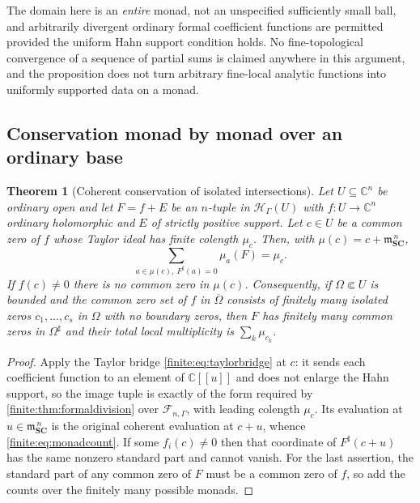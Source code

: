 \documentclass[11pt,letterpaper]{article}
\newtheorem{theorem}{Theorem}[section]
\theoremstyle{definition}
\theoremstyle{remark}
\newcommand{\SC}{\mathbf{SC}}
\newcommand{\C}{\mathbb C}
\newcommand{\HH}{\mathscr H}
\newcommand{\Af}{\mathscr F}
\newcommand{\mm}{\mathfrak m}
\newcommand{\sh}{^{\sharp}}
\numberwithin{equation}{section}
\begin{document}
The domain here is an \emph{entire} monad, not an unspecified sufficiently small ball, and arbitrarily divergent ordinary formal coefficient functions are permitted provided the uniform Hahn support condition holds. No fine-topological convergence of a sequence of partial sums is claimed anywhere in this argument, and the proposition does not turn arbitrary fine-local analytic functions into uniformly supported data on a monad.

\subsection{Conservation monad by monad over an ordinary base}
\label{finite:sec:monadcount}

\begin{theorem}[Coherent conservation of isolated intersections]
\label{finite:thm:monadcount}
Let $U\subseteq\C^n$ be ordinary open and let $F=f+E$ be an $n$-tuple in $\HH_\Gamma(U)$ with $f:U\to\C^n$ ordinary holomorphic and $E$ of strictly positive support. Let $c\in U$ be a common zero of $f$ whose Taylor ideal has finite colength $\mu_c$. Then, with $\mu(c)=c+\mm_{\SC}^{\,n}$,
\begin{equation}\label{finite:eq:monadcount}
 \sum_{a\in\mu(c),\ F\sh(a)=0}\mu_a(F)=\mu_c .
\end{equation}
If $f(c)\neq0$ there is no common zero in $\mu(c)$. Consequently, if $\Omega\Subset U$ is bounded and the common zero set of $f$ in $\overline\Omega$ consists of finitely many isolated zeros $c_1,\ldots,c_s$ in $\Omega$ with no boundary zeros, then $F$ has finitely many common zeros in $\Omega\sh$ and their total local multiplicity is $\sum_{k}\mu_{c_k}$.
\end{theorem}

\begin{proof}
Apply the Taylor bridge \eqref{finite:eq:taylorbridge} at $c$: it sends each coefficient function to an element of $\C[[u]]$ and does not enlarge the Hahn support, so the image tuple is exactly of the form required by \cref{finite:thm:formaldivision} over $\Af_{n,\Gamma}$, with leading colength $\mu_c$. Its evaluation at $u\in\mm_{\SC}^{\,n}$ is the original coherent evaluation at $c+u$, whence \eqref{finite:eq:monadcount}. If some $f_i(c)\neq0$ then that coordinate of $F\sh(c+u)$ has the same nonzero standard part and cannot vanish. For the last assertion, the standard part of any common zero of $F$ must be a common zero of $f$, so add the counts over the finitely many possible monads.
\end{proof}
\end{document}

